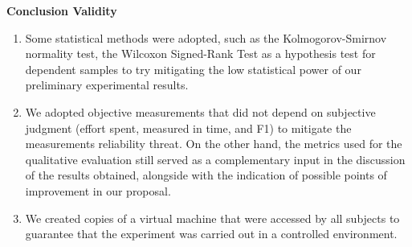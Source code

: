 \textbf{Conclusion Validity}
\begin{enumerate} [label=\roman*]
    \item Some statistical methods were adopted, such as the Kolmogorov-Smirnov normality test, the Wilcoxon Signed-Rank Test as a hypothesis test for dependent samples to try mitigating the low statistical power of our preliminary experimental results.
    \item We adopted objective measurements that did not depend on subjective judgment (effort spent, measured in time, and F1) to mitigate the measurements reliability threat.
    On the other hand, the metrics used for the qualitative evaluation still served as a complementary input in the discussion of the results obtained, alongside with the indication of possible points of improvement in our proposal.
    \item We created copies of a virtual machine that were accessed by all subjects to guarantee that the experiment was carried out in a controlled environment.
\end{enumerate}

